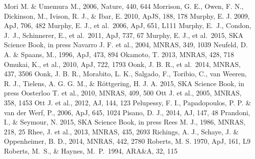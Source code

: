 \begin{thebibliography}{99}
\begin{multicols}{2}
{
	Mori M. \& Umemura M., 2006, Nature, 440, 644
    	Morrison, G. E., Owen, F. N., Dickinson, M., Ivison, R. J., \& Ibar, E. 2010, ApJS, 188, 178
    	Murphy, E. J. 2009, ApJ, 706, 482
    	Murphy, E. J., et al.\ 2006, ApJ, 651, L111
	Murphy, E.~J., Condon, J.~J., Schinnerer, E., et al.\ 2011, ApJ, 737, 67 
    	Murphy, E. J., et al.\ 2015, SKA Science Book, in press
	Navarro J. F. et al., 2004, MNRAS, 349, 1039
     	Neufeld, D. A. \& Spaans, M., 1996, ApJ, 473, 894
   	Okamoto, T. 2013, MNRAS, 428, 718
      Omukai, K., et al., 2010, ApJ, 722, 1793
    	Oonk, J. B. R., et al.\ 2014, MNRAS, 437, 3506
    	Oonk, J. B. R., Morabito, L. K., Salgado, F., Toribio, C., van Weeren, R. J.,
    	Tielens, A. G. G. M., \& R\"{o}ttgering, H. J. A. 2015, SKA Science Book, in press
	Oosterloo T. et al., 2010, MNRAS, 409, 500
	Ott J. et al., 2005, MNRAS, 358, 1453
	Ott J. et al., 2012, AJ, 144, 123
	Pelupessy, F. I., Papadopoulos, P. P. \& van der Werf, P., 2006, ApJ, 645, 1024
	Pisano, D. J., 2014, AJ, 147, 48
    	Prandoni, I., \& Seymour, N. 2015, SKA Science Book, in press
	Rees M. J., 1986, MNRAS, 218, 25
	Rhee, J. et al., 2013, MNRAS, 435, 2693
	Richings, A. J., Schaye, J. \& Oppenheimer, B. D., 2014, MNRAS, 442, 2780
    	Roberts, M. S. 1970, ApJ, 161, L9
	Roberts, M.~S., \& Haynes, M.~P.\ 1994, ARA\&A, 32, 115 
}
\end{multicols}
\end{thebibliography}
